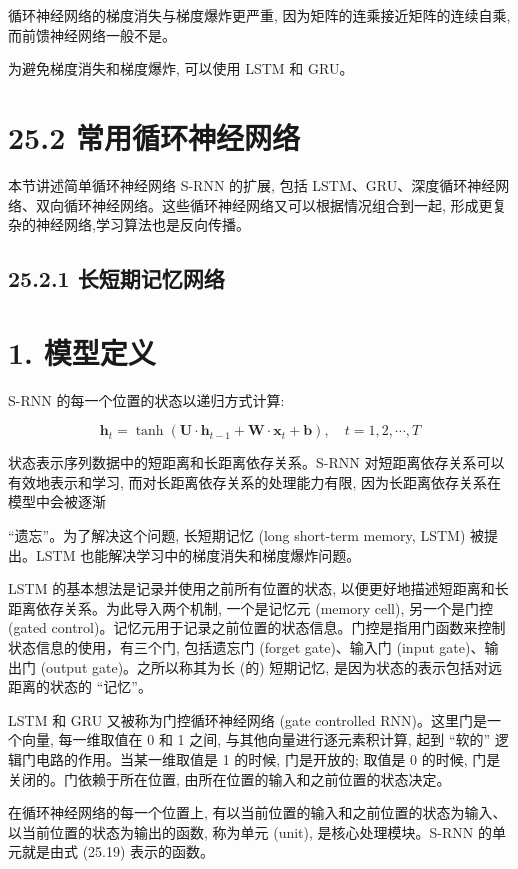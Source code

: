 \documentclass[10pt]{article}
\begin{document}
循环神经网络的梯度消失与梯度爆炸更严重, 因为矩阵的连乘接近矩阵的连续自乘, 而前馈神经网络一般不是。

为避免梯度消失和梯度爆炸, 可以使用 LSTM 和 GRU。

\section*{25.2 常用循环神经网络}
本节讲述简单循环神经网络 S-RNN 的扩展, 包括 LSTM、GRU、深度循环神经网络、双向循环神经网络。这些循环神经网络又可以根据情况组合到一起, 形成更复杂的神经网络,学习算法也是反向传播。

\subsection*{25.2.1 长短期记忆网络}
\section*{1. 模型定义}
S-RNN 的每一个位置的状态以递归方式计算:


\begin{equation*}
\boldsymbol{h}_{t}=\tanh \left(\boldsymbol{U} \cdot \boldsymbol{h}_{t-1}+\boldsymbol{W} \cdot \boldsymbol{x}_{t}+\boldsymbol{b}\right), \quad t=1,2, \cdots, T \tag{25.19}
\end{equation*}


状态表示序列数据中的短距离和长距离依存关系。S-RNN 对短距离依存关系可以有效地表示和学习, 而对长距离依存关系的处理能力有限, 因为长距离依存关系在模型中会被逐渐

“遗忘”。为了解决这个问题, 长短期记忆 (long short-term memory, LSTM) 被提出。LSTM 也能解决学习中的梯度消失和梯度爆炸问题。

LSTM 的基本想法是记录并使用之前所有位置的状态, 以便更好地描述短距离和长距离依存关系。为此导入两个机制, 一个是记忆元 (memory cell), 另一个是门控 (gated control)。记忆元用于记录之前位置的状态信息。门控是指用门函数来控制状态信息的使用，有三个门, 包括遗忘门 (forget gate)、输入门 (input gate)、输出门 (output gate)。之所以称其为长 (的) 短期记忆, 是因为状态的表示包括对远距离的状态的 “记忆”。

LSTM 和 GRU 又被称为门控循环神经网络 (gate controlled RNN)。这里门是一个向量, 每一维取值在 0 和 1 之间, 与其他向量进行逐元素积计算, 起到 “软的” 逻辑门电路的作用。当某一维取值是 1 的时候, 门是开放的; 取值是 0 的时候, 门是关闭的。门依赖于所在位置, 由所在位置的输入和之前位置的状态决定。

在循环神经网络的每一个位置上, 有以当前位置的输入和之前位置的状态为输入、以当前位置的状态为输出的函数, 称为单元 (unit), 是核心处理模块。S-RNN 的单元就是由式 (25.19) 表示的函数。
\end{document}
